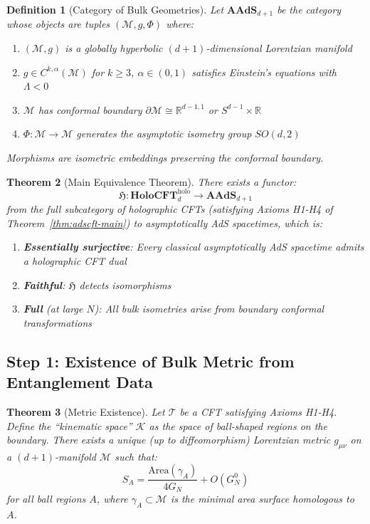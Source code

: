 \documentclass[12pt,a4paper]{article}
\newtheorem{theorem}{Theorem}[section]
\newtheorem{definition}[theorem]{Definition}
\begin{document}
\begin{definition}[Category of Bulk Geometries]\label{def:bulk-geom-cat}
Let $\mathbf{AAdS}_{d+1}$ be the category whose objects are tuples $(\mathcal{M}, g, \Phi)$ where:
\begin{enumerate}
    \item $(\mathcal{M}, g)$ is a globally hyperbolic $(d+1)$-dimensional Lorentzian manifold
    \item $g \in C^{k,\alpha}(\mathcal{M})$ for $k \geq 3$, $\alpha \in (0,1)$ satisfies Einstein's equations with $\Lambda < 0$
    \item $\mathcal{M}$ has conformal boundary $\partial\mathcal{M} \cong \mathbb{R}^{d-1,1}$ or $S^{d-1} \times \mathbb{R}$
    \item $\Phi: \mathcal{M} \to \mathcal{M}$ generates the asymptotic isometry group $SO(d,2)$
\end{enumerate}
Morphisms are isometric embeddings preserving the conformal boundary.
\end{definition}

\begin{theorem}[Main Equivalence Theorem]\label{thm:main-equivalence}
There exists a functor:
\begin{equation}
\mathfrak{H}: \mathbf{HoloCFT}_d^{\text{holo}} \longrightarrow \mathbf{AAdS}_{d+1}
\end{equation}
from the full subcategory of holographic CFTs (satisfying Axioms H1-H4 of Theorem~\ref{thm:adscft-main}) to asymptotically AdS spacetimes, which is:
\begin{enumerate}
    \item \textbf{Essentially surjective}: Every classical asymptotically AdS spacetime admits a holographic CFT dual
    \item \textbf{Faithful}: $\mathfrak{H}$ detects isomorphisms
    \item \textbf{Full} (at large $N$): All bulk isometries arise from boundary conformal transformations
\end{enumerate}
\end{theorem}

\subsection{Step 1: Existence of Bulk Metric from Entanglement Data}

\begin{theorem}[Metric Existence]\label{thm:metric-existence-full}
Let $\mathcal{T}$ be a CFT satisfying Axioms H1-H4. Define the ``kinematic space'' $\mathcal{K}$ as the space of ball-shaped regions on the boundary. There exists a unique (up to diffeomorphism) Lorentzian metric $g_{\mu\nu}$ on a $(d+1)$-manifold $\mathcal{M}$ such that:
\begin{equation}
S_A = \frac{\text{Area}({\gamma_A})}{4G_N} + O(G_N^0)
\end{equation}
for all ball regions $A$, where $\gamma_A \subset \mathcal{M}$ is the minimal area surface homologous to $A$.
\end{theorem}
\end{document}
